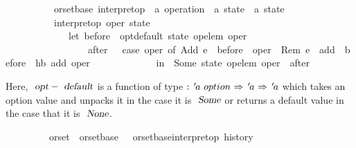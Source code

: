\begin{isabellebody}
\ \ \ \ \ \ \ \ \ {\isacharparenleft}\ orset{\isacharunderscore}base{\isacharparenright}\ interpret{\isacharunderscore}op\ {\isacharcolon}{\isacharcolon}\ {\isachardoublequoteopen}{\isacharprime}a\ operation\ {\isasymRightarrow}\ {\isacharprime}a\ state\ {\isasymrightharpoonup}\ {\isacharprime}a\ state{\isachardoublequoteclose}\ {\isacharparenleft}{\isachardoublequoteopen}{\isasymlangle}{\isacharunderscore}{\isasymrangle}{\isachardoublequoteclose}\ {\isacharbrackleft}{}{\isacharbrackright}\ {}{}{}{}{\isacharparenright}\ \isanewline
\ \ \ \ \ \ \ \ \ \ {\isachardoublequoteopen}interpret{\isacharunderscore}op\ oper\ state\ {\isasymequiv}\isanewline
\ \ \ \ \ \ \ \ \ \ \ \ \ let\ before\ {\isacharequal}\ opt{\isacharunderscore}default\ {\isacharparenleft}state\ {\isacharparenleft}op{\isacharunderscore}elem\ oper{\isacharparenright}{\isacharparenright}\ {\isacharbraceleft}{\isacharbraceright}{\isacharsemicolon}\isanewline
\ \ \ \ \ \ \ \ \ \ \ \ \ \ \ \ \ after\ \ {\isacharequal}\ case\ oper\ of\ Add\ e\ {\isasymRightarrow}\ before\ {\isasymunion}\ {\isacharbraceleft}oper{\isacharbraceright}\ {\isacharbar}\ Rem\ e\ {\isasymRightarrow}\ {\isacharbraceleft}add\ {\isasymin}\ before{\isachardot}\ {\isasymnot}\ hb\ add\ oper{\isacharbraceright}\isanewline
\ \ \ \ \ \ \ \ \ \ \ \ \ in\ \ Some\ {\isacharparenleft}state\ {\isacharparenleft}{\isacharparenleft}op{\isacharunderscore}elem\ oper{\isacharparenright}\ {\isasymmapsto}\ after{\isacharparenright}{\isacharparenright}{\isachardoublequoteclose}
\end{isabellebody}
Here, $\isa{opt}-\isa{default}$ is a function of type ${\isacharcolon}\ {\isachardoublequoteopen}{\isacharprime}a\ option\ {\isasymRightarrow}\ {\isacharprime}a\ {\isasymRightarrow}\ {\isacharprime}a$ which takes an option value and unpacks it in the case it is $\isa{Some}$ or returns a default value in the case that it is $\isa{None}$.

\begin{isabellebody}
\ \ \ \ \ \ \ \ \ orset\ {\isacharequal}\ orset{\isacharunderscore}base\ {\isacharunderscore}\ {\isacharunderscore}\ {\isachardoublequoteopen}orset{\isacharunderscore}base{\isachardot}interpret{\isacharunderscore}op\ history{\isachardoublequoteclose}
\end{isabellebody}

